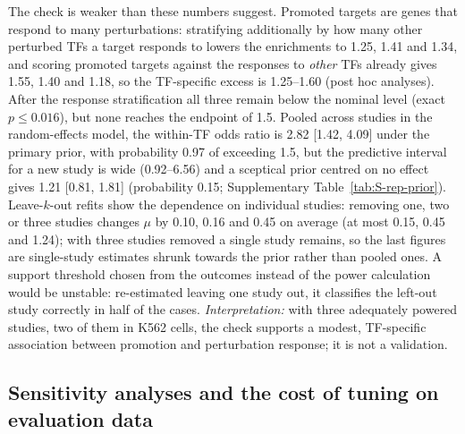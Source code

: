 \documentclass[11pt,a4paper]{article}
\begin{document}
The check is weaker than these numbers suggest.
Promoted targets are genes that respond to many perturbations: stratifying additionally by how many other perturbed TFs a target responds to lowers the enrichments to 1.25, 1.41 and 1.34, and scoring promoted targets against the responses to \emph{other} TFs already gives 1.55, 1.40 and 1.18, so the TF-specific excess is 1.25--1.60 (post hoc analyses).
After the response stratification all three remain below the nominal level (exact $p\le0.016$), but none reaches the endpoint of 1.5.
Pooled across studies in the random-effects model, the within-TF odds ratio is 2.82 [1.42, 4.09] under the primary prior, with probability 0.97 of exceeding 1.5, but the predictive interval for a new study is wide (0.92--6.56) and a sceptical prior centred on no effect gives 1.21 [0.81, 1.81] (probability 0.15; Supplementary Table~\ref{tab:S-rep-prior}).
Leave-$k$-out refits show the dependence on individual studies: removing one, two or three studies changes $\mu$ by 0.10, 0.16 and 0.45 on average (at most 0.15, 0.45 and 1.24); with three studies removed a single study remains, so the last figures are single-study estimates shrunk towards the prior rather than pooled ones.
A support threshold chosen from the outcomes instead of the power calculation would be unstable: re-estimated leaving one study out, it classifies the left-out study correctly in half of the cases.
\emph{Interpretation:} with three adequately powered studies, two of them in K562 cells, the check supports a modest, TF-specific association between promotion and perturbation response; it is not a validation.


\subsection{Sensitivity analyses and the cost of tuning on evaluation data}\label{sec:res-sensitivity}
\end{document}
